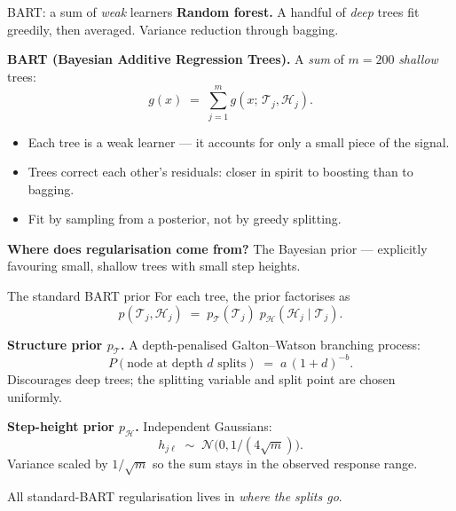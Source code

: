 \documentclass[10pt,aspectratio=169]{beamer}
\newcommand{\T}{\mathcal{T}}
\newcommand{\Hh}{\mathcal{H}}
\newcommand{\N}{\mathcal{N}}
\begin{document}
\begin{frame}{BART: a sum of \emph{weak} learners}
\textbf{Random forest.} A handful of \emph{deep} trees fit greedily, then averaged. Variance reduction through bagging.

\bigskip

\textbf{BART (Bayesian Additive Regression Trees).} A \emph{sum} of $m = 200$ \emph{shallow} trees:
\[
g(x) \;=\; \sum_{j=1}^{m} g(x;\, \T_j, \Hh_j).
\]
\begin{itemize}
  \item Each tree is a \alert{weak learner} — it accounts for only a small piece of the signal.
  \item Trees correct each other's residuals: closer in spirit to boosting than to bagging.
  \item Fit by sampling from a posterior, not by greedy splitting.
\end{itemize}

\bigskip

\textbf{Where does regularisation come from?} The Bayesian prior — explicitly favouring small, shallow trees with small step heights.
\end{frame}

\begin{frame}{The standard BART prior}
For each tree, the prior factorises as
\[
p(\T_j, \Hh_j) \;=\; p_\T(\T_j)\; p_\Hh(\Hh_j \mid \T_j).
\]

\textbf{Structure prior $p_\T$.} A depth-penalised Galton--Watson branching process:
\[
P(\text{node at depth } d \text{ splits}) \;=\; a\,(1 + d)^{-b}.
\]
Discourages deep trees; the splitting variable and split point are chosen uniformly.

\bigskip

\textbf{Step-height prior $p_\Hh$.} Independent Gaussians:
\[
h_{j\ell} \;\sim\; \N\!\bigl(0, 1/(4\sqrt{m})\bigr).
\]
Variance scaled by $1/\sqrt{m}$ so the sum stays in the observed response range.

\bigskip

\alert{All standard-BART regularisation lives in \emph{where the splits go}.}
\end{frame}
\end{document}
